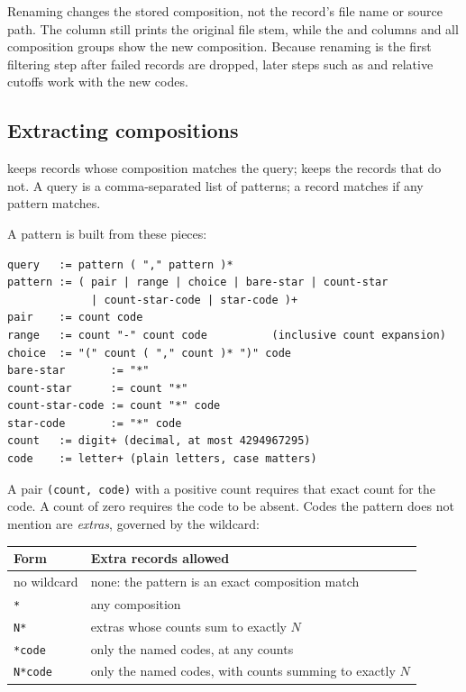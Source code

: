 Renaming changes the stored composition, not the record's file name or source
path. The  column still prints the original file stem, while the
 and  columns and all composition groups show the new
composition. Because renaming is the first filtering step after failed records
are dropped, later steps such as  and relative cutoffs work with
the new codes.

\subsection{Extracting compositions}\label{sec:extract}

 keeps records whose composition matches the query;
 keeps the records that do not. A query is a
comma-separated list of patterns; a record matches if any pattern matches.

A pattern is built from these pieces:

\begin{verbatim}
query   := pattern ( "," pattern )*
pattern := ( pair | range | choice | bare-star | count-star
             | count-star-code | star-code )+
pair    := count code
range   := count "-" count code          (inclusive count expansion)
choice  := "(" count ( "," count )* ")" code
bare-star       := "*"
count-star      := count "*"
count-star-code := count "*" code
star-code       := "*" code
count   := digit+ (decimal, at most 4294967295)
code    := letter+ (plain letters, case matters)
\end{verbatim}

A pair \texttt{(count, code)} with a positive count requires that exact count
for the code. A count of zero requires the code to be absent. Codes the
pattern does not mention are \emph{extras}, governed by the wildcard:

\begin{center}
\begin{tabular}{@{}ll@{}}
\toprule
\textbf{Form} & \textbf{Extra records allowed} \\
\midrule
no wildcard & none: the pattern is an exact composition match \\
\texttt{*} & any composition \\
\texttt{N*} & extras whose counts sum to exactly $N$ \\
\texttt{*code} & only the named codes, at any counts \\
\texttt{N*code} & only the named codes, with counts summing to exactly $N$ \\
\bottomrule
\end{tabular}
\end{center}

